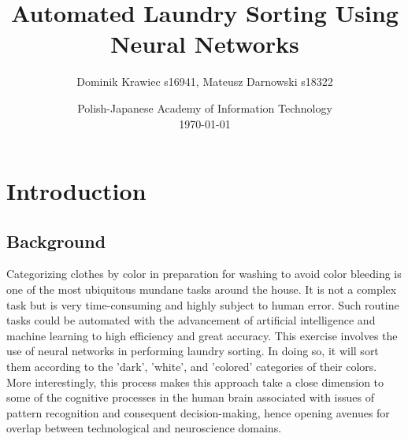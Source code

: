 \documentclass{article}
\title{Automated Laundry Sorting Using Neural Networks}
\author{Dominik Krawiec s16941, Mateusz Darnowski s18322}
\date{Polish-Japanese Academy of Information Technology\\\today}
\begin{document}
\pretitle{\vspace*{\fill}\begin{center}\Huge\bfseries} %
\posttitle{\end{center}\vspace*{\fill}} %
\preauthor{\begin{center}\large} %
\postauthor{\end{center}} %
\predate{\begin{center}\large} %
\postdate{\end{center}\vspace*{\fill}} %



\maketitle
\newpage

\tableofcontents
\newpage



\section{Introduction}

\subsection{Background}
Categorizing clothes by color in preparation for washing to avoid color bleeding is one of the most ubiquitous mundane tasks around the house. It is not a complex task but is very time-consuming and highly subject to human error. Such routine tasks could be automated with the advancement of artificial intelligence and machine learning to high efficiency and great accuracy. This exercise involves the use of neural networks in performing laundry sorting. In doing so, it will sort them according to the 'dark', 'white', and 'colored' categories of their colors. More interestingly, this process makes this approach take a close dimension to some of the cognitive processes in the human brain associated with issues of pattern recognition and consequent decision-making, hence opening avenues for overlap between technological and neuroscience domains.
\end{document}
